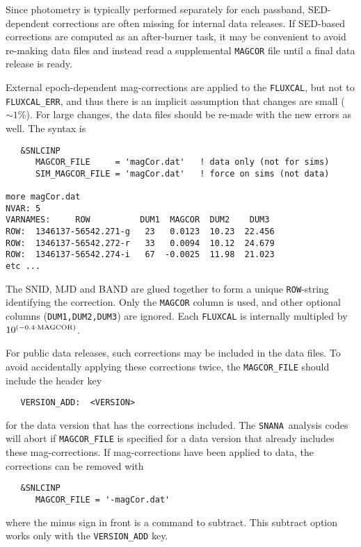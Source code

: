 \documentclass[12pt]{article}
\newcommand{\snana}{{\tt SNANA}}
\begin{document}
Since photometry is typically performed separately for each passband,
SED-dependent corrections are often missing for internal data
releases. If SED-based corrections are computed as an after-burner
task, it may be convenient to avoid re-making data files and instead
read a supplemental {\tt MAGCOR} file until a final data release is ready.

External epoch-dependent mag-corrections are applied to the {\tt FLUXCAL}, 
but not to {\tt FLUXCAL\_ERR},
and thus there is an implicit assumption that changes
are small ($\sim 1$\%).
For large changes, the data files should be re-made 
with the new errors as well. The syntax is
%
\begin{verbatim}
   &SNLCINP
      MAGCOR_FILE     = 'magCor.dat'   ! data only (not for sims)
      SIM_MAGCOR_FILE = 'magCor.dat'   ! force on sims (not data)

more magCor.dat
NVAR: 5
VARNAMES:     ROW          DUM1  MAGCOR  DUM2    DUM3
ROW:  1346137-56542.271-g   23   0.0123  10.23  22.456
ROW:  1346137-56542.272-r   33   0.0094  10.12  24.679
ROW:  1346137-56542.274-i   67  -0.0025  11.98  21.023
etc ...
\end{verbatim}
The SNID, MJD and BAND are glued together to form
a unique {\tt ROW}-string identifying the correction. 
Only the {\tt MAGCOR} column is used, and other optional
columns ({\tt DUM1,DUM2,DUM3}) are ignored.
Each {\tt FLUXCAL} is internally multipled by 
$10^{(-0.4\cdot {\rm MAGCOR})}$.

For public data releases, such corrections may be included
in the data files. To avoid accidentally applying these
corrections twice, the {\tt MAGCOR\_FILE} should include
the header key
\begin{verbatim}
   VERSION_ADD:  <VERSION>
\end{verbatim}
%
for the data version that has the corrections included.
The \snana\ analysis codes will abort if {\tt MAGCOR\_FILE}
is specified for a data version that already includes these
mag-corrections.   
If mag-corrections have been applied to data,
the corrections can be removed with 
\begin{verbatim}
   &SNLCINP
      MAGCOR_FILE = '-magCor.dat'
\end{verbatim}
%
where the minus sign in front is a command to subtract.
This subtract option works only with the {\tt VERSION\_ADD} key.

\end{document}
